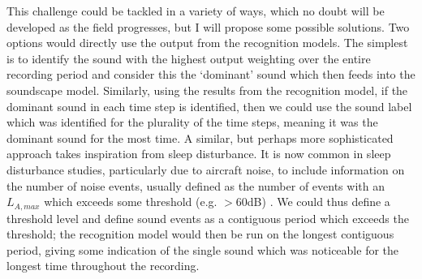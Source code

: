This challenge could be tackled in a variety of ways, which no doubt will be developed as the field progresses, but I will propose some possible solutions. Two options would directly use the output from the recognition models. The simplest is to identify the sound with the highest output weighting over the entire recording period and consider this the `dominant' sound which then feeds into the soundscape model. Similarly, using the results from the recognition model, if the dominant sound in each time step is identified, then we could use the sound label which was identified for the plurality of the time steps, meaning it was the dominant sound for the most time. A similar, but perhaps more sophisticated approach takes inspiration from sleep disturbance. It is now common in sleep disturbance studies, particularly due to aircraft noise, to include information on the number of noise events, usually defined as the number of events with an $L_{A,max}$ which exceeds some threshold (e.g. $>60$dB) \citep{Janssen2014effect}. We could thus define a threshold level and define sound events as a contiguous period which exceeds the threshold; the recognition model would then be run on the longest contiguous period, giving some indication of the single sound which was noticeable for the longest time throughout the recording. 

